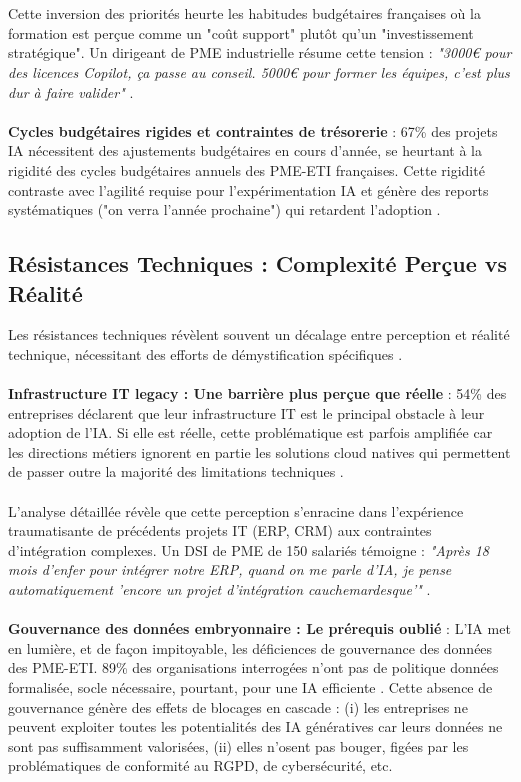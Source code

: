 \\\\
Cette inversion des priorités heurte les habitudes budgétaires françaises où la formation est perçue comme un "coût support" plutôt qu'un "investissement stratégique". Un dirigeant de PME industrielle résume cette tension : \emph{"3000€ pour des licences Copilot, ça passe au conseil. 5000€ pour former les équipes, c'est plus dur à faire valider"} \cite{luwai2025meetings}.
\\\\
\textbf{Cycles budgétaires rigides et contraintes de trésorerie} : 67\% des projets IA nécessitent des ajustements budgétaires en cours d'année, se heurtant à la rigidité des cycles budgétaires annuels des PME-ETI françaises. Cette rigidité contraste avec l'agilité requise pour l'expérimentation IA et génère des reports systématiques ("on verra l'année prochaine") qui retardent l'adoption \cite{anthony2020budget}.

\subsection{Résistances Techniques : Complexité Perçue vs Réalité}

Les résistances techniques révèlent souvent un décalage entre perception et réalité technique, nécessitant des efforts de démystification spécifiques \cite{davis1989perceived}.
\\\\
\textbf{Infrastructure IT legacy : Une barrière plus perçue que réelle} : 54\% des entreprises déclarent que leur infrastructure IT est le principal obstacle à leur adoption de l’IA. Si elle est réelle, cette problématique est parfois amplifiée car les directions métiers ignorent en partie les solutions cloud natives qui permettent de passer outre la majorité des limitations techniques \cite{aws2024cloud}.
\\\\
L'analyse détaillée révèle que cette perception s'enracine dans l'expérience traumatisante de précédents projets IT (ERP, CRM) aux contraintes d'intégration complexes. Un DSI de PME de 150 salariés témoigne : \emph{"Après 18 mois d'enfer pour intégrer notre ERP, quand on me parle d'IA, je pense automatiquement 'encore un projet d'intégration cauchemardesque'"} \cite{luwai2025meetings}.
\\\\
\textbf{Gouvernance des données embryonnaire : Le prérequis oublié} : L'IA met en lumière, et de façon impitoyable, les déficiences de gouvernance des données des PME-ETI. 89\% des organisations interrogées n'ont pas de politique données formalisée, socle nécessaire, pourtant, pour une IA efficiente \cite{wang2019data}. Cette absence de gouvernance génère des effets de blocages en cascade : (i) les entreprises ne peuvent exploiter toutes les potentialités des IA génératives car leurs données ne sont pas suffisamment valorisées, (ii) elles n'osent pas bouger, figées par les problématiques de conformité au RGPD, de cybersécurité, etc.
\\\\

